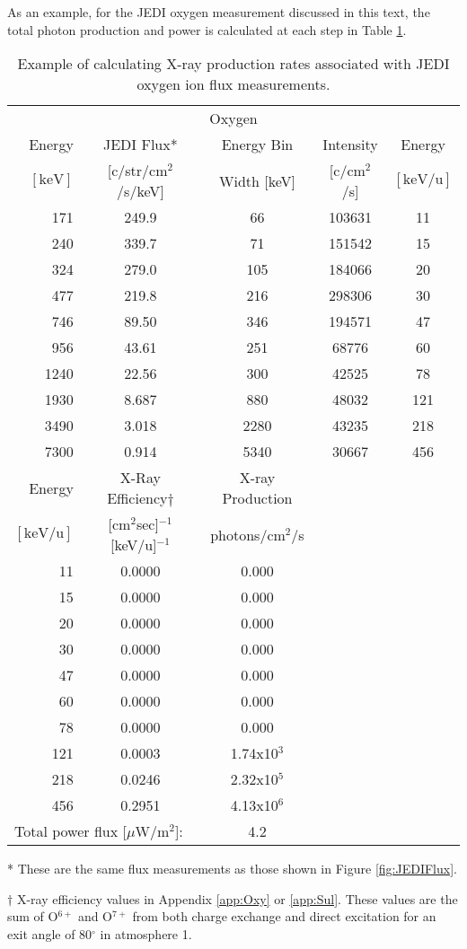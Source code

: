 As an example, for the JEDI oxygen measurement discussed in this text, the total photon production and power is calculated at each step in Table \ref{tab:JEDIFlux}.

\begin{table}
    \centering
    \caption{Example of calculating X-ray production rates associated with JEDI oxygen ion flux measurements.}
    \begin{tabular}{r|c|c|c|c}
    \multicolumn{5}{c}{Oxygen} \\ \cline{1-5}
    Energy & JEDI Flux* & Energy Bin & Intensity & Energy  \\
    $\mathrm{[keV]}$ & [c/str/cm$^2$/s/keV] & Width [keV] & [c/cm$^2$/s] & $\mathrm{[keV/u]}$ \\ \cline{1-5}
     171  & 249.9 &   66 & 103631 & 11  \\
     240  & 339.7 &   71 & 151542 & 15  \\
     324  & 279.0 &  105 & 184066 & 20  \\
     477  & 219.8 &  216 & 298306 & 30  \\
     746  & 89.50 &  346 & 194571 & 47  \\
     956  & 43.61 &  251 &  68776 & 60  \\
    1240  & 22.56 &  300 &  42525 & 78  \\
    1930  & 8.687 &  880 &  48032 & 121 \\
    3490  & 3.018 & 2280 &  43235 & 218 \\
    7300  & 0.914 & 5340 &  30667 & 456 \\ \cline{1-5}
    Energy  & X-Ray Efficiency$\dagger$ & X-ray Production \\
    $\mathrm{[keV/u]}$ & [cm$^2$sec]$^{-1}$[keV/u]$^{-1}$ & photons/cm$^2$/s \\ \cline{1-3}
    11    & 0.0000 & 0.000 \\
    15    & 0.0000 & 0.000 \\
    20    & 0.0000 & 0.000 \\
    30    & 0.0000 & 0.000 \\
    47    & 0.0000 & 0.000 \\
    60    & 0.0000 & 0.000 \\
    78    & 0.0000 & 0.000 \\
    121   & 0.0003 & 1.74x10$^{3}$  \\
    218   & 0.0246 & 2.32x10$^{5}$  \\
    456   & 0.2951 & 4.13x10$^{6}$ \\ \cline{1-3}
    \multicolumn{2}{l}{Total power flux [$\mu$W/m$^2$]:} & 4.2 \\ \cline{1-3}
    \end{tabular}
    \begin{flushleft}
    * These are the same flux measurements as those shown in Figure \ref{fig:JEDIFlux}.
    
    $\dagger$ X-ray efficiency values in Appendix \ref{app:Oxy} or \ref{app:Sul}. These values are the sum of O$^{6+}$ and O$^{7+}$ from both charge exchange and direct excitation for an exit angle of 80$^{\circ}$ in atmosphere 1.
    \end{flushleft}
    \label{tab:JEDIFlux}
\end{table}


